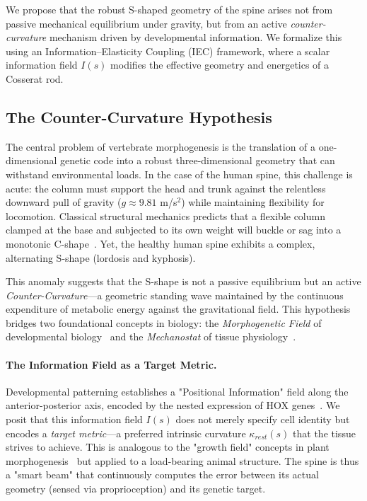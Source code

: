 \documentclass[11pt,a4paper]{article}
\begin{document}
We propose that the robust S-shaped geometry of the spine arises not from passive mechanical equilibrium under gravity, but from an active \emph{counter-curvature} mechanism driven by developmental information. We formalize this using an Information--Elasticity Coupling (IEC) framework, where a scalar information field $I(s)$ modifies the effective geometry and energetics of a Cosserat rod.

\subsection{The Counter-Curvature Hypothesis}

The central problem of vertebrate morphogenesis is the translation of a one-dimensional genetic code into a robust three-dimensional geometry that can withstand environmental loads. In the case of the human spine, this challenge is acute: the column must support the head and trunk against the relentless downward pull of gravity ($g \approx 9.81$ m/s$^2$) while maintaining flexibility for locomotion. Classical structural mechanics predicts that a flexible column clamped at the base and subjected to its own weight will buckle or sag into a monotonic C-shape~\cite{goriely2017mathematics}. Yet, the healthy human spine exhibits a complex, alternating S-shape (lordosis and kyphosis).

This anomaly suggests that the S-shape is not a passive equilibrium but an active \emph{Counter-Curvature}---a geometric standing wave maintained by the continuous expenditure of metabolic energy against the gravitational field. This hypothesis bridges two foundational concepts in biology: the \emph{Morphogenetic Field} of developmental biology~\cite{wolpert1969positional, saunders1948proximodistal} and the \emph{Mechanostat} of tissue physiology~\cite{frost1987mechanostat}.

\paragraph{The Information Field as a Target Metric.}
Developmental patterning establishes a "Positional Information" field along the anterior-posterior axis, encoded by the nested expression of HOX genes~\cite{wellik2007hox}. We posit that this information field $I(s)$ does not merely specify cell identity but encodes a \emph{target metric}---a preferred intrinsic curvature $\kappa_{rest}(s)$ that the tissue strives to achieve. This is analogous to the "growth field" concepts in plant morphogenesis~\cite{coen2004war} but applied to a load-bearing animal structure. The spine is thus a "smart beam" that continuously computes the error between its actual geometry (sensed via proprioception) and its genetic target.
\end{document}
